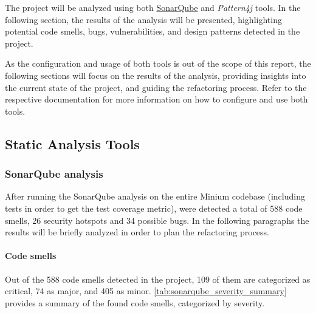 The project will be analyzed using both \href{https://www.sonarsource.com/}{SonarQube} and \textit{Pattern4j} tools. In the following section, the results of the analysis will be presented, highlighting potential code smells, bugs, vulnerabilities, and design patterns detected in the project.

As the configuration and usage of both tools is out of the scope of this report, the following sections will focus on the results of the analysis, providing insights into the current state of the project, and guiding the refactoring process. Refer to the respective documentation for more information on how to configure and use both tools.

\subsection{Static Analysis Tools}

\subsubsection{SonarQube analysis}

After running the SonarQube analysis on the entire Minium codebase (including tests in order to get the test coverage metric), were detected a total of 588 code smells, 26 security hotspots and 34 possible bugs. In the following paragraphs the results will be briefly analyzed in order to plan the refactoring process.

\paragraph*{Code smells} Out of the 588 code smells detected in the project, 109 of them are categorized as critical, 74 as major, and 405 as minor. \autoref{tab:sonarqube_severity_summary} provides a summary of the found code smells, categorized by severity.


